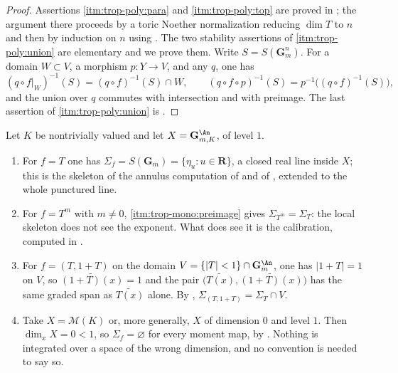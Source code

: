 \begin{proof}
Assertions \cref{itm:trop-poly:para} and \cref{itm:trop-poly:top} are proved
in \cite[\S\S12.6 and 12.9]{CLD25}; the argument
there proceeds by a toric Noether normalization reducing $\dim T$ to $n$
and then by induction on $n$ using
. The two stability assertions of
\cref{itm:trop-poly:union} are elementary and we prove them. Write
$S=S(\mathbf G_m^n)$. For a domain $W\subset V$, a morphism $p:Y\to V$, and
any $q$, one has
\[
 (q\circ f|_W)^{-1}(S)=(q\circ f)^{-1}(S)\cap W,
 \qquad
 (q\circ f\circ p)^{-1}(S)=p^{-1}\bigl((q\circ f)^{-1}(S)\bigr),
\]
and the union over $q$ commutes with intersection and with preimage. The
last assertion of
\cref{itm:trop-poly:union} is \cite[Proposition~12.6.7]{CLD25}.
\end{proof}

\begin{example}
\label{ex:trop-sigma-dim-one}
Let $K$ be nontrivially valued and let $X=\mathbf G_{m,K}^{\An}$, of level
$1$.
\begin{enumerate}
\item For $f=T$ one has $\Sigma_f=S(\mathbf G_m)=\{\eta_u:u\in\mathbf R\}$,
  a closed real line inside $X$; this is the skeleton of the annulus
  computation of  and of
  , extended to the whole punctured line.
\item For $f=T^m$ with $m\ne0$, 
  \cref{itm:trop-mono:preimage} gives $\Sigma_{T^m}=\Sigma_T$: the local
  skeleton does not see the exponent. What does see it is the calibration,
  computed in .
\item For $f=(T,1+T)$ on the domain $V=\{|T|<1\}\cap\mathbf G_m^{\An}$, one
  has $|1+T|=1$ on $V$, so $\widetilde{(1+T)(x)}=1$ and the pair
  $\bigl(\widetilde{T(x)},\widetilde{(1+T)(x)}\bigr)$ has the same
  graded span as $\widetilde{T(x)}$ alone. By
  ,
  $\Sigma_{(T,1+T)}=\Sigma_T\cap V$.
\item Take $X=\mathcal M(K)$ or, more generally, $X$ of dimension $0$ and
  level $1$. Then $\dim_xX=0<1$, so $\Sigma_f=\varnothing$ for every moment
  map, by . Nothing is integrated over a
  space of the wrong dimension, and no convention is needed to say so.
\end{enumerate}
\end{example}

